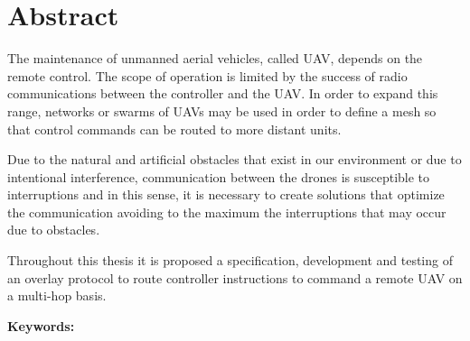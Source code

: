 \chapter*{Abstract}

The maintenance of unmanned aerial vehicles, called UAV, depends on the remote control. The scope of operation is limited by the success of radio communications between the controller and the UAV. In order to expand this range, networks or swarms of UAVs may be used in order to define a mesh so that control commands can be routed to more distant units.

Due to the natural and artificial obstacles that exist in our environment or due to intentional interference, communication between the drones is susceptible to interruptions and in this sense, it is necessary to create solutions that optimize the communication avoiding to the maximum the interruptions that may occur due to obstacles.

Throughout this thesis it is proposed a specification, development and testing of an overlay protocol to route controller instructions to command a remote UAV on a multi-hop basis.\newline 

\noindent\textbf{Keywords: }%
\makeatletter
\@keywords
\makeatother